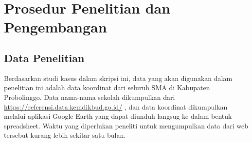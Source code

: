 \section{Prosedur Penelitian dan Pengembangan}


\subsection{Data Penelitian}
    
Berdasarkan studi kasus dalam skripsi ini, data yang akan digunakan dalam penelitian ini adalah data koordinat dari seluruh SMA di Kabupaten Probolinggo. Data nama-nama sekolah dikumpulkan dari \url{https://referensi.data.kemdikbud.go.id/} \cite{kemendikbud}, dan data koordinat dikumpulkan melalui aplikasi Google Earth yang dapat diunduh langsug ke dalam bentuk spreadsheet. Waktu yang diperlukan peneliti untuk mengumpulkan data dari web tersebut kurang lebih sekitar satu bulan.

